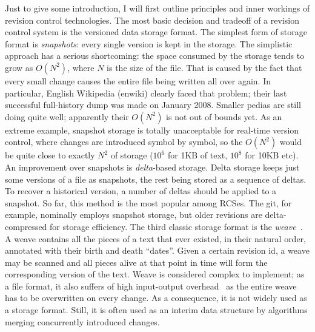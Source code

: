 \documentclass{sig-alternate}
\begin{document}
Just to give some introduction, I will first outline principles and inner workings of revision control technologies.
The most basic decision and tradeoff of a revision control system is the versioned data storage format.
The simplest form of storage format is \emph{snapshots}: every single  version is kept in the storage.
The simplistic approach has a serious shortcoming: the space consumed by the storage tends to grow as $O(N^2)$, where $N$ is the size of the file.
That is caused by the fact that every small change causes the entire file being written all over again.
In particular, English Wikipedia (enwiki) clearly faced that problem; their last successful full-history dump was made on January 2008.
Smaller pedias are still doing quite well; apparently their $O(N^2)$ is not out of bounds yet.
As an extreme example, snapshot storage is totally unacceptable for real-time version control, where changes are introduced symbol by symbol, so the $O(N^2)$ would be quite close to exactly $N^2$ of storage ($10^{6}$ for 1KB of text, $10^{8}$ for 10KB etc).
An improvement over snapshots is \emph{delta}-based storage.
Delta storage keeps just some versions of a file as snapshots, the rest being stored as a sequence of deltas.
To recover a historical version, a number of deltas should be applied to a snapshot.
So far, this method is the most popular among RCSes.
The git, for example, nominally employs snapshot storage, but older revisions are delta-compressed for storage efficiency. 
The third classic storage format is the  \emph{weave}~\cite{rcs-txt,revctrl-weave}. 
A weave contains all the pieces of a text that ever existed, in their natural order, annotated with their birth and death ``dates''.
Given a certain revision id, a weave may be scanned and all pieces alive at that point in time will form the corresponding version of the text.
Weave is considered complex to implement; as a file format, it also suffers of high input-output overhead~\cite{bazaar-weave} as the entire weave has to be overwritten on every change.
As a consequence, it is not widely used as a storage format.
Still, it is often used as an interim data structure by algorithms merging concurrently introduced changes.
\end{document}
